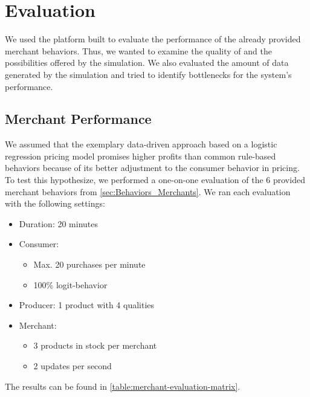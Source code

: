 %
\section{Evaluation}
\label{sec:evaluation}
%
We used the platform built to evaluate the performance of the already provided merchant behaviors. Thus, we wanted to examine the quality of and the possibilities offered by the simulation. We also evaluated the amount of data generated by the simulation and tried to identify bottlenecks for the system's performance.


\subsection{Merchant Performance}
\label{sec:merchant_evaluation}
%
We assumed that the exemplary data-driven approach based on a logistic regression pricing model promises higher profits than common rule-based behaviors because of its better adjustment to the consumer behavior in pricing. To test this hypothesize, we performed a one-on-one evaluation of the 6 provided merchant behaviors from \cref{sec:Behaviors_Merchants}. We ran each evaluation with the following settings:

\begin{itemize}
    \item Duration: 20 minutes
    \item Consumer:
    \begin{itemize}[nosep]
        \item Max. 20 purchases per minute
        \item 100\% logit-behavior
    \end{itemize}
    \item Producer: 1 product with 4 qualities
    \item Merchant: 
    \begin{itemize}
        \item 3 products in stock per merchant
        \item 2 updates per second
    \end{itemize}
\end{itemize}

The results can be found in \cref{table:merchant-evaluation-matrix}.

